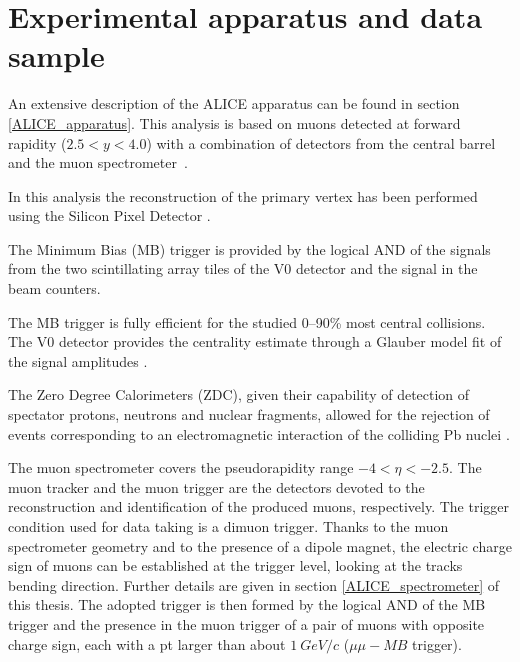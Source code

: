 \section{Experimental apparatus and data sample}
\label{expapp}
An extensive description of the ALICE apparatus can be found in section \ref{ALICE_apparatus}.
This analysis is based on muons detected at forward rapidity ($2.5<y<4.0$) with a combination of detectors from the central barrel and the muon spectrometer~\cite{Aamodt:2011gj}. 

In this analysis the reconstruction of the primary vertex has been performed using the Silicon Pixel Detector \cite{Aamodt:2010aa}.

The Minimum Bias (MB) trigger is provided by the logical AND of the signals from the two scintillating array tiles of the V0 detector \cite{Abbas:2013taa} and the signal in the beam counters.

The MB trigger is fully efficient for the studied 0--90\% most central collisions.
The V0 detector provides the centrality estimate through a Glauber model fit of the signal amplitudes \cite{Abelev:2013qoq,Adam:2015ptt}.

The Zero Degree Calorimeters (ZDC), given their capability of detection of spectator protons, neutrons and nuclear fragments, allowed for the rejection of events corresponding to an electromagnetic interaction of the colliding Pb nuclei \cite{ALICE:2012aa}.

The muon spectrometer covers the pseudorapidity range $-4<\eta<-2.5$.
The muon tracker and the muon trigger are the detectors devoted to the reconstruction and identification of the produced muons, respectively.
The trigger condition used for data taking is a dimuon trigger.
Thanks to the muon spectrometer geometry and to the presence of a dipole magnet, the electric charge sign of muons can be established at the trigger level, looking at the tracks bending direction.
Further details are given in section \ref{ALICE_spectrometer} of this thesis.
The adopted trigger is then formed by the logical AND of the MB trigger and the presence in the muon trigger of a pair of muons with opposite charge sign, each with a pt larger than about $1\ GeV/c$ ($\mu \mu-MB$ trigger). 


